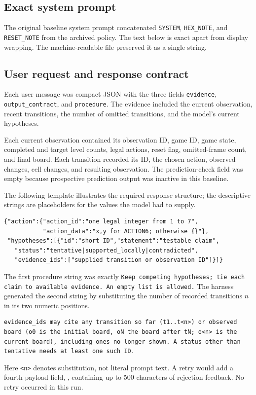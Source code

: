 \subsection{Exact system prompt}
The original baseline system prompt concatenated \texttt{SYSTEM}, \texttt{HEX\_NOTE}, and \texttt{RESET\_NOTE} from the archived policy. The text below is exact apart from display wrapping. The machine-readable file preserved it as a single string.


\subsection{User request and response contract}
Each user message was compact JSON with the three fields \texttt{evidence}, \texttt{output\_contract}, and \texttt{procedure}. The evidence included the current observation, recent transitions, the number of omitted transitions, and the model's current hypotheses.

Each current observation contained its observation ID, game ID, game state, completed and target level counts, legal actions, reset flag, omitted-frame count, and final board. Each transition recorded its ID, the chosen action, observed changes, cell changes, and resulting observation. The prediction-check field was empty because prospective prediction output was inactive in this baseline.

The following template illustrates the required response structure; the descriptive strings are placeholders for the values the model had to supply.
\begin{lstlisting}
{"action":{"action_id":"one legal integer from 1 to 7",
           "action_data":"x,y for ACTION6; otherwise {}"},
 "hypotheses":[{"id":"short ID","statement":"testable claim",
   "status":"tentative|supported_locally|contradicted",
   "evidence_ids":["supplied transition or observation ID"]}]}
\end{lstlisting}
The first procedure string was exactly \texttt{Keep competing hypotheses; tie each claim to available evidence. An empty list is allowed.} The harness generated the second string by substituting the number of recorded transitions $n$ in its two numeric positions.
\begin{lstlisting}
evidence_ids may cite any transition so far (t1..t<n>) or observed board (o0 is the initial board, oN the board after tN; o<n> is the current board), including ones no longer shown. A status other than tentative needs at least one such ID.
\end{lstlisting}
Here \texttt{<n>} denotes substitution, not literal prompt text. A retry would add a fourth payload field, , containing up to 500 characters of rejection feedback. No retry occurred in this run.

